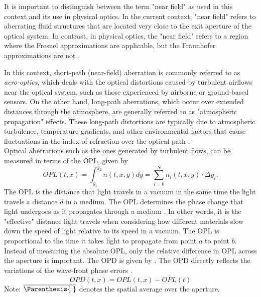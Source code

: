     It is important to distinguish between the
    term "near field" as used in this context and its use in physical optics. In
    the current context, "near field" refers to aberrating fluid structures that
    are located very close to the exit aperture of the optical system. In contrast,
    in physical optics, the "near field" refers to a region where the Fresnel
    approximations are applicable, but the Fraunhofer approximations are
    not \cite{Jumper2001}.

    In this context, short-path (near-field) aberration is commonly referred to as
    \textit{aero-optics}, which deals with the optical distortions caused by turbulent
    airflows near the optical system, such as those experienced by airborne or
    ground-based sensors. On the other hand, long-path aberrations, which occur
    over extended distances through the atmosphere, are generally referred to as
    "atmospheric propagation" effects. These long-path distortions are typically
    due to atmospheric turbulence, temperature gradients, and other environmental
    factors that cause fluctuations in the index of refraction over the optical
    path \cite{Jumper2001}.\\

    Optical aberrations such as the ones generated by turbulent flows, can be
    measured in terms of the \gls{OPL}, given by
    \begin{equation}\label{eq:OPL}
        OPL(t,x) = \int_{y_1}^{y_2} n(t,x,y)dy = \sum_{i=0}^N n_i(t,x,y) \cdot
        \Delta y_i.
    \end{equation}
    The \gls{OPL} is the distance that light
    travels in a vacuum in the same time the light travels
    a distance $d$ in a medium. The \gls{OPL} determines the phase change that light
    undergoes as it propagates through a medium \cite{Jenkins1976}. In other
    words, it is the "effective" distance light travels when considering how
    different materials slow down the speed of light relative to its speed in a
    vacuum. The \gls{OPL} is proportional to the time it takes light to
    propagate from point $a$ to point $b$. \\

    Instead of measuring the absolute \gls{OPL}, only the relative difference in
    \gls{OPL} across the aperture is important. The \gls{OPD} is given by
    . The \gls{OPD} directly reflects the variations of the
    wave-front phase errors \cite{Wang2007}.
    \begin{equation}\label{eq:OPD}
        OPD(t,x) = OPL(t,x) - \overline{OPL}(t)
    \end{equation}
    Note: $\overline{\Parenthesis{\;}}$ denotes the spatial average over the
    aperture.\\ 

